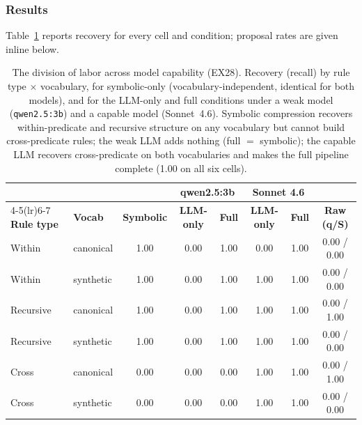 \documentclass[10pt,conference]{IEEEtran}
\begin{document}
\subsubsection{Results}
Table~\ref{tab:ex28} reports recovery for every cell and condition; proposal rates are given inline below.

\begin{table}[t]
\centering
\caption{The division of labor across model capability (EX28). Recovery (recall) by rule type $\times$ vocabulary, for symbolic-only (vocabulary-independent, identical for both models), and for the LLM-only and full conditions under a weak model (\texttt{qwen2.5:3b}) and a capable model (Sonnet~4.6). Symbolic compression recovers within-predicate and recursive structure on any vocabulary but cannot build cross-predicate rules; the weak LLM adds nothing (full $=$ symbolic); the capable LLM recovers cross-predicate on both vocabularies and makes the full pipeline complete (1.00 on all six cells).}
\label{tab:ex28}
\begin{tabular}{llcccccc}
\toprule
 & & & \multicolumn{2}{c}{\textbf{qwen2.5:3b}} & \multicolumn{2}{c}{\textbf{Sonnet 4.6}} & \\
\cmidrule(lr){4-5}\cmidrule(lr){6-7}
\textbf{Rule type} & \textbf{Vocab} & \textbf{Symbolic} & \textbf{LLM-only} & \textbf{Full} & \textbf{LLM-only} & \textbf{Full} & \textbf{Raw (q/S)} \\
\midrule
Within     & canonical  & 1.00 & 0.00 & 1.00 & 0.00 & 1.00 & 0.00 / 0.00 \\
Within     & synthetic  & 1.00 & 0.00 & 1.00 & 1.00 & 1.00 & 0.00 / 0.00 \\
Recursive  & canonical  & 1.00 & 0.00 & 1.00 & 1.00 & 1.00 & 0.00 / 1.00 \\
Recursive  & synthetic  & 1.00 & 0.00 & 1.00 & 1.00 & 1.00 & 0.00 / 0.00 \\
Cross      & canonical  & 0.00 & 0.00 & 0.00 & 1.00 & 1.00 & 0.00 / 1.00 \\
Cross      & synthetic  & 0.00 & 0.00 & 0.00 & 1.00 & 1.00 & 0.00 / 0.00 \\
\bottomrule
\end{tabular}
\end{table}
\end{document}
